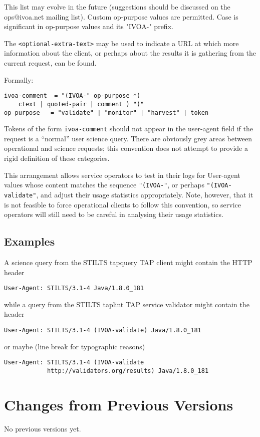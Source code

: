 \documentclass[11pt,a4paper]{ivoa}
\begin{document}
This list may evolve in the future (suggestions should be discussed on
the ops@ivoa.net mailing list). Custom op-purpose values are permitted.
Case is significant in op-purpose values and its "IVOA-" prefix.

The \verb|<optional-extra-text>| may  be used to indicate a URL at which
more information about the client, or perhaps about the results it is
gathering from the current request, can be found.

Formally:

\begin{lstlisting}
ivoa-comment  = "(IVOA-" op-purpose *( 
    ctext | quoted-pair | comment ) ")"
op-purpose   = "validate" | "monitor" | "harvest" | token
\end{lstlisting}

Tokens of the form \verb|ivoa-comment| should not appear in the
user-agent field if the request is a ``normal'' user science query. There
are obviously grey areas between operational and science requests; this
convention does not attempt to provide a rigid definition of these
categories.

This arrangement allows service operators to test in their logs for
User-agent values whose content matches the sequence \verb|"(IVOA-"|, or
perhaps \verb|"(IVOA-validate"|, and adjust their usage statistics
appropriately. Note, however, that it is not feasible to force operational
clients to follow this convention, so service operators will still need
to be careful in analysing their usage statistics.

\subsection{Examples}

A science query from the STILTS tapquery TAP client might contain the
HTTP header
\begin{lstlisting}
User-Agent: STILTS/3.1-4 Java/1.8.0_181
\end{lstlisting}
while a query from the STILTS taplint TAP service validator might
contain the header
\begin{lstlisting}
User-Agent: STILTS/3.1-4 (IVOA-validate) Java/1.8.0_181
\end{lstlisting}
or maybe (line break for typographic reasons)
\begin{lstlisting}
User-Agent: STILTS/3.1-4 (IVOA-validate
            http://validators.org/results) Java/1.8.0_181
\end{lstlisting}

\appendix
\section{Changes from Previous Versions}

No previous versions yet.  



\end{document}
